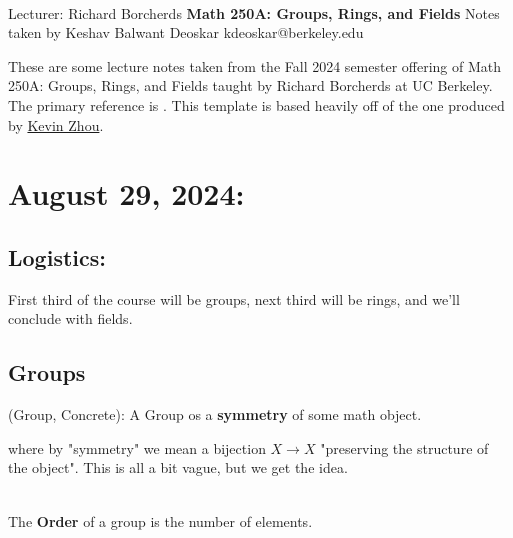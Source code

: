 \documentclass[11pt]{article}
\begin{document}
\thispagestyle{empty}
\bigskip \
\vspace{0.1cm}

\begin{center}
{\fontsize{22}{22} \selectfont Lecturer: Richard Borcherds}
\vskip 16pt
{\fontsize{30}{30} \selectfont \bf \sffamily Math 250A: Groups, Rings, and Fields}
\vskip 24pt
{\fontsize{14}{14} \selectfont \rmfamily Notes taken by Keshav Balwant Deoskar} 
\vskip 6pt
{\fontsize{14}{14} \selectfont \ttfamily kdeoskar@berkeley.edu} 
\vskip 24pt
\end{center}



These are some lecture notes taken from the Fall 2024 semester offering of Math 250A: Groups, Rings, and Fields taught by Richard Borcherds at UC Berkeley. The primary reference is \cite{Lang02}. This template is based heavily off of the one produced by \href{https://knzhou.github.io/}{Kevin Zhou}.

\setcounter{tocdepth}{3}
\tableofcontents 

\newpage
\section{August 29, 2024:}

\subsection{Logistics:}
First third of the course will be groups, next third will be rings, and we'll conclude with fields.

\subsection{Groups}

\begin{bluebox}
  \begin{definition}
    (Group, Concrete): A Group os a \textbf{symmetry} of some math object.
  \end{definition}
\end{bluebox}
where by "symmetry" we mean a bijection $X \rightarrow X$ "preserving the structure of the object". This is all a bit vague, but we get the idea.
\\
\\
\begin{definition}
  The \textbf{Order} of a group is the number of elements.
\end{definition}
\end{document}
